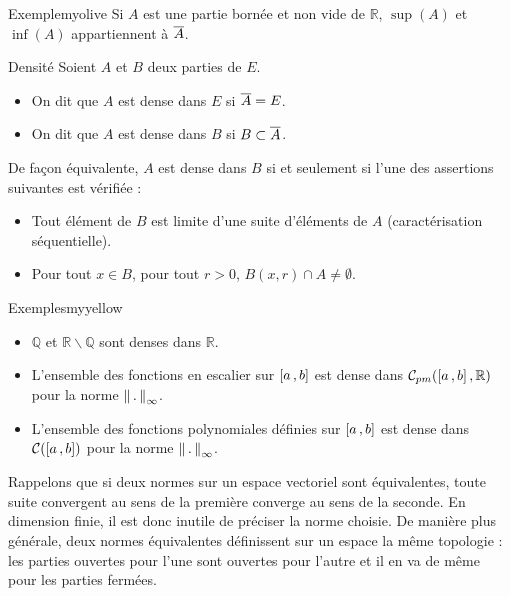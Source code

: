     \begin{omed}{Exemple}{myolive}
        Si $A$ est une partie bornée et non vide de $\mathbb{R}$, $\sup(A)$ et $\inf(A)$ appartiennent à $\overline{A}$.
    \end{omed}

    \begin{defi}{Densité}{}
        Soient $A$ et $B$ deux parties de $E$.
        \begin{itemize}
            \item On dit que $A$ est dense dans $E$ si $\overline{A} = E$.
            \item On dit que $A$ est dense dans $B$ si $B \subset \overline{A}$.
        \end{itemize}
    \end{defi}

    De façon équivalente, $A$ est dense dans $B$ si et seulement si l’une des assertions suivantes est vérifiée : 
    \begin{itemize}
        \item Tout élément de $B$ est limite d’une suite d’éléments de $A$ (caractérisation séquentielle).
        \item Pour tout $x \in B$, pour tout $r > 0$, $B(x,r) \cap A \neq \emptyset$.
    \end{itemize}

    \begin{omed}{Exemples}{myyellow}
        \begin{itemize}
            \item $\mathbb{Q}$ et $\mathbb{R} \backslash \mathbb{Q}$ sont denses dans $\mathbb{R}$.
            \item L’ensemble des fonctions en escalier sur $\left[ a \, , b \right]$ est dense dans $\mathcal{C}_{pm}(\left[ a \, , b \right],\mathbb{R})$ pour la norme $\left\lVert \,. \, \right\rVert_{\infty}$.
            \item L’ensemble des fonctions polynomiales définies sur $\left[ a \, , b \right]$ est dense dans $\mathcal{C}(\left[ a \, , b \right])$ pour la norme $\left\lVert \,. \, \right\rVert_{\infty}$.
        \end{itemize}
    \end{omed}

    Rappelons que si deux normes sur un espace vectoriel sont équivalentes, toute suite convergent au sens de la première converge au sens de la seconde. En dimension finie, il est donc inutile de préciser la norme choisie. De manière plus générale, deux normes équivalentes définissent sur un espace la même topologie : les parties ouvertes pour l’une sont ouvertes pour l’autre et il en va de même pour les parties fermées.

